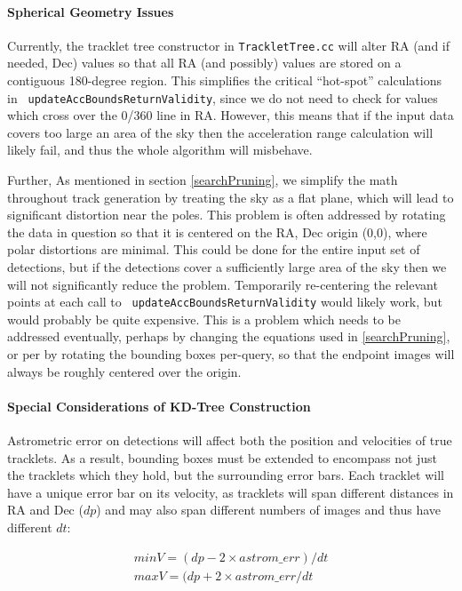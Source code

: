 \paragraph{Spherical Geometry Issues}
Currently, the tracklet tree constructor in {\tt TrackletTree.cc} will
alter RA (and if needed, Dec) values so that all RA (and possibly)
values are stored on a contiguous 180-degree region.  This simplifies
the critical ``hot-spot'' calculations in {\tt
  updateAccBoundsReturnValidity}, since we do not need to check for
values which cross over the 0/360 line in RA.  However, this means
that if the input data covers too large an area of the sky then the
acceleration range calculation will likely fail, and thus the whole
algorithm will misbehave.

Further, As mentioned in section \ref{searchPruning}, we simplify the
math throughout track generation by treating the sky as a flat plane,
which will lead to significant distortion near the poles.  This
problem is often addressed by rotating the data in question so that it
is centered on the RA, Dec origin (0,0), where polar distortions are
minimal.  This could be done for the entire input set of detections,
but if the detections cover a sufficiently large area of the sky then
we will not significantly reduce the problem.  Temporarily
re-centering the relevant points at each call to {\tt
  updateAccBoundsReturnValidity} would likely work, but would probably
be quite expensive.  This is a problem which needs to be addressed
eventually, perhaps by changing the equations used in
\ref{searchPruning}, or per by rotating the bounding boxes per-query,
so that the endpoint images will always be roughly centered over the
origin.


\paragraph{Special Considerations of KD-Tree Construction} 

Astrometric error on detections will affect both the position and
velocities of true tracklets.  As a result, bounding boxes must be
extended to encompass not just the tracklets which they hold, but the
surrounding error bars.  Each tracklet will have a unique error bar on
its velocity, as tracklets will span different distances in RA and Dec
($dp$) and may also span different numbers of images and thus have
different $dt$:

\begin{eqnarray}
minV = (dp - 2\times astrom\_err)/dt  \\
maxV = (dp + 2\times astrom\_err /dt
\end{eqnarray}

